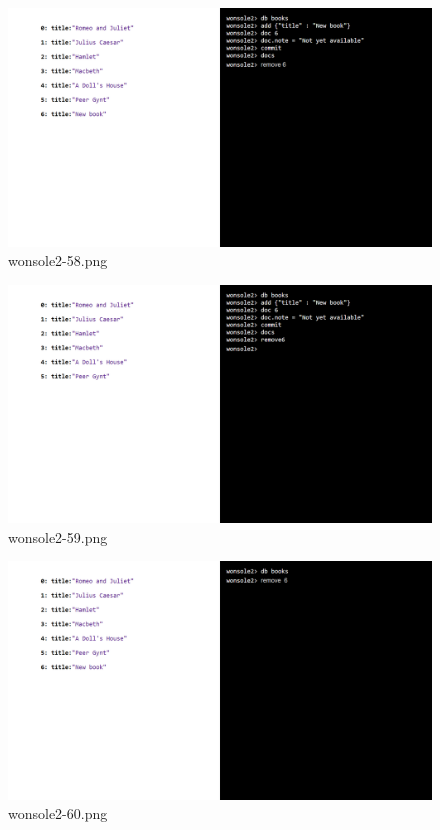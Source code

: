 \begin{figure}
\includegraphics[width=\textwidth]{screenshot/wonsole2/wonsole2-58.png}
\caption{wonsole2-58.png}
\label{wonsole2-58.png}
\end{figure}


\clearpage
\begin{figure}
\includegraphics[width=\textwidth]{screenshot/wonsole2/wonsole2-59.png}
\caption{wonsole2-59.png}
\label{wonsole2-59.png}
\end{figure}


\begin{figure}
\includegraphics[width=\textwidth]{screenshot/wonsole2/wonsole2-60.png}
\caption{wonsole2-60.png}
\label{wonsole2-60.png}
\end{figure}


